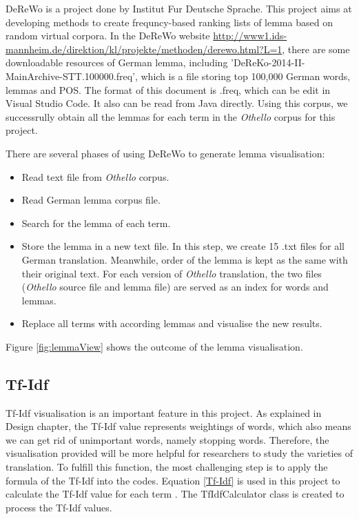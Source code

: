 DeReWo is a project done by Institut Fur Deutsche Sprache. This project aims at developing methods to create frequncy-based ranking lists of lemma based on random virtual corpora. In the DeReWo website \url{http://www1.ids-mannheim.de/direktion/kl/projekte/methoden/derewo.html?L=1}, there are some downloadable resources of German lemma, including 'DeReKo-2014-II-MainArchive-STT.100000.freq', which is a file storing top 100,000 German words, lemmas and POS. The format of this document is .freq, which can be edit in Visual Studio Code. It also can be read from Java directly. Using this corpus, we successrully obtain all the lemmas for each term in the \emph{Othello} corpus for this project.

There are several phases of using DeReWo to generate lemma visualisation:
\begin{itemize}
	\item \textbf{} Read text file from \emph{Othello} corpus.	
	\item \textbf{} Read German lemma corpus file.
	\item \textbf{} Search for the lemma of each term.
	\item \textbf{} Store the lemma in a new text file. In this step, we create 15 .txt files for all German translation. Meanwhile, order of the lemma is kept as the same with their original text. For each version of \emph{Othello} translation, the two files (\emph{Othello} source file and lemma file) are served as an index for words and lemmas.
	\item \textbf{} Replace all terms with according lemmas and visualise the new results.
\end{itemize}	

Figure \ref{fig:lemmaView} shows the outcome of the lemma visualisation. 

\subsection{Tf-Idf}

Tf-Idf visualisation is an important feature in this project. As explained in Design chapter, the Tf-Idf value represents weightings of words, which also means we can get rid of unimportant words, namely stopping words. Therefore, the visualisation provided will be more helpful for researchers to study the varieties of translation. To fulfill this function, the most challenging step is to apply the formula of the Tf-Idf into the codes. Equation \ref{Tf-Idf} is used in this project to calculate the Tf-Idf value for each term \cite{Asking Mohammad about the equation referance}. The TfIdfCalculator class is created to process the Tf-Idf values.

